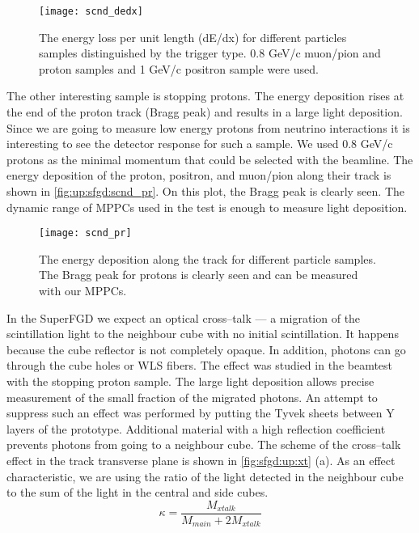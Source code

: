 \documentclass[main.tex]{subfiles}
\begin{document}
\begin{figure}[!ht]
	\centering
	\texttt{[image: scnd\_dedx]}
	\caption{The energy loss per unit length (dE/dx) for different particles samples distinguished by the trigger type. 0.8 GeV/c muon/pion and proton samples and 1 GeV/c positron sample were used.}
	\label{fig:up:sfgd:scnd_dedx}
\end{figure}

The other interesting sample is stopping protons. The energy deposition rises at the end of the proton track (Bragg peak) and results in a large light deposition. Since we are going to measure low energy protons from neutrino interactions it is interesting to see the detector response for such a sample. We used 0.8 GeV/c protons as the minimal momentum that could be selected with the beamline. The energy deposition of the proton, positron, and muon/pion along their track is shown in \autoref{fig:up:sfgd:scnd_pr}. On this plot, the Bragg peak is clearly seen. The dynamic range of MPPCs used in the test is enough to measure light deposition.

\begin{figure}[!ht]
	\centering
	\texttt{[image: scnd\_pr]}
	\caption{The energy deposition along the track for different particle samples. The Bragg peak for protons is clearly seen and can be measured with our MPPCs.}
	\label{fig:up:sfgd:scnd_pr}
\end{figure}

In the SuperFGD we expect an optical cross--talk --- a migration of the scintillation light to the neighbour cube with no initial scintillation. It happens because the cube reflector is not completely opaque. In addition, photons can go through the cube holes or WLS fibers. The effect was studied in the beamtest with the stopping proton sample. The large light deposition allows precise measurement of the small fraction of the migrated photons. An attempt to suppress such an effect was performed by putting the Tyvek sheets between Y layers of the prototype. Additional material with a high reflection coefficient prevents photons from going to a neighbour cube. The scheme of the cross--talk effect in the track transverse plane is shown in \autoref{fig:sfgd:up:xt} (a). As an effect characteristic, we are using the ratio of the light detected in the neighbour cube to the sum of the light in the central and side cubes.
\begin{equation}
\label{eq:xt}
\kappa=\frac{M_{xtalk}}{M_{main}+2M_{xtalk}}
\end{equation}
\end{document}
